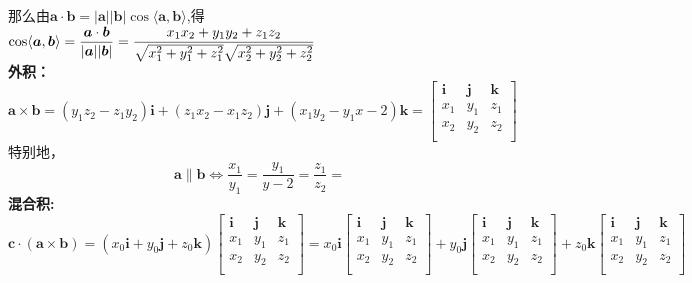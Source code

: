 \noindent 那么由$\boldsymbol{a}\cdot\boldsymbol{b}=|\boldsymbol{a}||\boldsymbol{b}|\cos\langle \boldsymbol{a},\boldsymbol{b}\rangle$,得$\displaystyle\cos\langle \boldsymbol{a},\boldsymbol{b}\rangle=\frac{\boldsymbol{a}\cdot\boldsymbol{b}}{|\boldsymbol{a}||\boldsymbol{b}|}=\frac{x_1x_2+y_1y_2+z_1z_2}{\sqrt{x_1^2+y_1^2+z_1^2}\sqrt{x_2^2+y_2^2+z_2^2}}$\\

\noindent \textbf{外积：}$\boldsymbol{a}\times\boldsymbol{b}=(y_1z_2-z_1y_2)\boldsymbol{i}+(z_1x_2-x_1z_2)\boldsymbol{j}+(x_1y_2-y_1x-2)\boldsymbol{k}=
	\begin{bmatrix}
		\boldsymbol{i} & \boldsymbol{j} & \boldsymbol{k}\\
		x_1 & y_1 & z_1\\
		x_2 & y_2 & z_2\\
	\end{bmatrix}$\\
特别地，
\begin{equation}
	\boldsymbol{a}\parallel\boldsymbol{b}\Leftrightarrow \frac{x_1}{y_1}=\frac{y_1}{y-2}=\frac{z_1}{z_2}=
\end{equation}
\textbf{混合积:}
\begin{equation}
	\nonumber
	\boldsymbol{c}\cdot(\boldsymbol{a}\times\boldsymbol{b})=(x_0\boldsymbol{i}+y_0\boldsymbol{j}+z_0\boldsymbol{k})	
	\begin{bmatrix}
		\boldsymbol{i} & \boldsymbol{j} & \boldsymbol{k}\\
		x_1 & y_1 & z_1\\
		x_2 & y_2 & z_2\\
	\end{bmatrix}=x_0\boldsymbol{i}
	\begin{bmatrix}
	\boldsymbol{i} & \boldsymbol{j} & \boldsymbol{k}\\
	x_1 & y_1 & z_1\\
	x_2 & y_2 & z_2\\
\end{bmatrix}+y_0\boldsymbol{j}	
\begin{bmatrix}
\boldsymbol{i} & \boldsymbol{j} & \boldsymbol{k}\\
x_1 & y_1 & z_1\\
x_2 & y_2 & z_2\\
\end{bmatrix}+z_0\boldsymbol{k}	
\begin{bmatrix}
\boldsymbol{i} & \boldsymbol{j} & \boldsymbol{k}\\
x_1 & y_1 & z_1\\
x_2 & y_2 & z_2\\
\end{bmatrix}
\end{equation}
